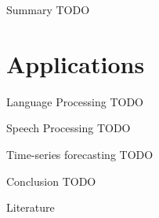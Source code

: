 \documentclass{beamer}
\begin{document}
    \begin{frame}{Summary}
      TODO
    \end{frame}

    \section{Applications}
    \begin{frame}{Language Processing}
      TODO
    \end{frame}

    \begin{frame}{Speech Processing}
      TODO
    \end{frame}

    \begin{frame}{Time-series forecasting}
      TODO
    \end{frame}


    \begin{frame}{Conclusion}
      TODO
    \end{frame}

    \begin{frame}{Literature}
      \printbibliography
    \end{frame}
\end{document}
